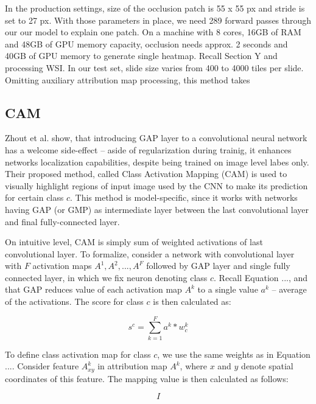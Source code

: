 In the production settings, size of the occlusion patch is 55 x 55 px and stride is set to 27 px. With those parameters in place, we need 289 forward passes through our our model to explain one patch. On a machine with 8 cores, 16GB of RAM and 48GB of GPU memory capacity, occlusion needs approx. 2 seconds and 40GB of GPU memory to generate single heatmap. Recall Section Y and processing WSI. In our test set, slide size varies from 400 to 4000 tiles per slide. Omitting auxiliary attribution map processing, this method takes  


\subsection{CAM}

Zhout et al. show, that introducing GAP layer to a convolutional neural network has a welcome side-effect -- aside of regularization during trainig, it enhances networks localization capabilities, despite being trained on image level labes only. Their proposed method, called Class Activation Mapping (CAM) is used to visually highlight regions of input image used by the CNN to make its prediction for certain class $c$. This method is model-specific, since it works with networks having GAP (or GMP) as intermediate layer between the last convolutional layer and final fully-connected layer. 

On intuitive level, CAM is simply sum of weighted activations of last convolutional layer. To formalize, consider a network with convolutional layer with $F$ activation maps $A^1, A^2, ..., A^F$ followed by GAP layer and single fully connected layer, in which we fix neuron denoting class $c$. Recall Equation ..., and that GAP reduces value of each activation map $A^k$ to a single value $a^k$ -- average of the activations. The score for class $c$ is then calculated as:

\begin{equation}
    s^c = \sum_{k=1}^F a^k * w^k_c
\end{equation}

To define class activation map for class $c$, we use the same weights as in Equation .... Consider feature $A^k_{xy}$ in attribution map $A^k$, where $x$ and $y$ denote spatial coordinates of this feature. The mapping value is then calculated as follows:

\begin{equation}
    I
\end{equation}

